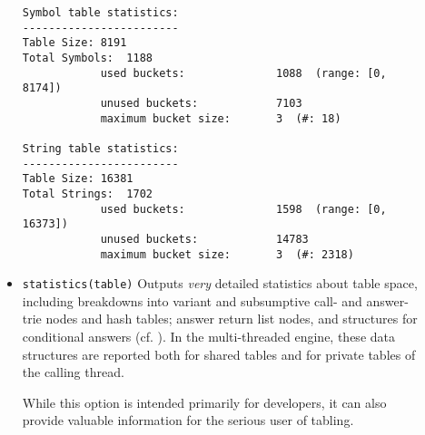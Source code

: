 \begin{description}
\begin{itemize}
{\begin{verbatim}
Symbol table statistics:
------------------------
Table Size:	8191
Total Symbols:	1188
            used buckets:              1088  (range: [0, 8174])
            unused buckets:            7103
            maximum bucket size:       3  (#: 18)

String table statistics:
------------------------
Table Size:	16381
Total Strings:	1702
            used buckets:              1598  (range: [0, 16373])
            unused buckets:            14783
            maximum bucket size:       3  (#: 2318)
\end{verbatim}}
%
\item {\tt statistics(table)} Outputs {\em very} detailed statistics
  about table space, including breakdowns into variant and subsumptive
  call- and answer- trie nodes and hash tables; answer return list
  nodes, and structures for conditional answers (cf. \cite{SaSw98,
    RRSSW98, TST99, CuSW99a}).  In the multi-threaded engine, these
  data structures are reported both for shared tables and for private
  tables of the calling thread.

  While this option is intended primarily for developers, it can also
  provide valuable information for the serious user of tabling.
\end{itemize}

\end{description}





